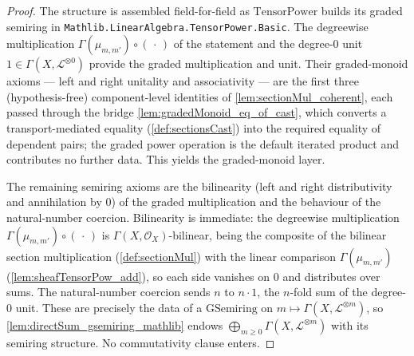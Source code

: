 \begin{proof}
  The structure is assembled field-for-field as \(\mathrm{TensorPower}\) builds its
  graded semiring in \texttt{Mathlib.LinearAlgebra.TensorPower.Basic}. The
  degreewise multiplication \(\Gamma(\mu_{m,m'}) \circ (\,\cdot\,)\) of the
  statement and the degree-\(0\) unit \(1 \in \Gamma(X, \mathcal{L}^{\otimes 0})\)
  provide the graded multiplication and unit. Their graded-monoid axioms --- left
  and right unitality and associativity --- are the first three (hypothesis-free)
  component-level identities of \cref{lem:sectionMul_coherent}, each passed through
  the bridge \cref{lem:gradedMonoid_eq_of_cast}, which converts a
  transport-mediated equality (\cref{def:sectionsCast}) into the required equality
  of dependent pairs; the graded power operation is the default iterated product
  and contributes no further data. This yields the graded-monoid layer.

  The remaining semiring axioms are the bilinearity (left and right distributivity
  and annihilation by \(0\)) of the graded multiplication and the behaviour of the
  natural-number coercion. Bilinearity is immediate: the degreewise multiplication
  \(\Gamma(\mu_{m,m'}) \circ (\,\cdot\,)\) is \(\Gamma(X,\mathcal{O}_X)\)-bilinear,
  being the composite of the bilinear section multiplication (\cref{def:sectionMul})
  with the linear comparison \(\Gamma(\mu_{m,m'})\)
  (\cref{lem:sheafTensorPow_add}), so each side vanishes on \(0\) and distributes
  over sums. The natural-number coercion sends \(n\) to \(n \cdot 1\), the
  \(n\)-fold sum of the degree-\(0\) unit. These are precisely the data of a
  \(\mathrm{GSemiring}\) on \(m \mapsto \Gamma(X, \mathcal{L}^{\otimes m})\), so
  \cref{lem:directSum_gsemiring_mathlib} endows
  \(\bigoplus_{m \ge 0} \Gamma(X, \mathcal{L}^{\otimes m})\) with its semiring
  structure. No commutativity clause enters.
\end{proof}

